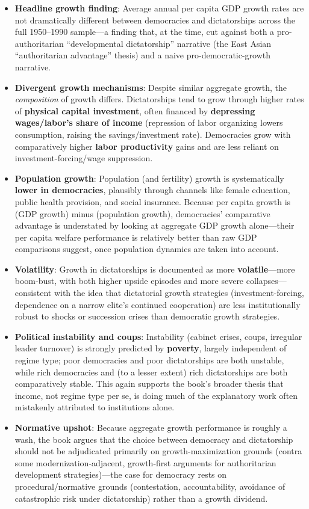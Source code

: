 \documentclass[12pt]{article}
\begin{document}
\begin{itemize}[leftmargin=*, itemsep=4pt]
    \item \textbf{Headline growth finding}: Average annual per capita GDP growth rates are not dramatically different between democracies and dictatorships across the full 1950--1990 sample---a finding that, at the time, cut against both a pro-authoritarian ``developmental dictatorship'' narrative (the East Asian ``authoritarian advantage'' thesis) and a naive pro-democratic-growth narrative.
    \item \textbf{Divergent growth mechanisms}: Despite similar aggregate growth, the \textit{composition} of growth differs. Dictatorships tend to grow through higher rates of \textbf{physical capital investment}, often financed by \textbf{depressing wages/labor's share of income} (repression of labor organizing lowers consumption, raising the savings/investment rate). Democracies grow with comparatively higher \textbf{labor productivity} gains and are less reliant on investment-forcing/wage suppression.
    \item \textbf{Population growth}: Population (and fertility) growth is systematically \textbf{lower in democracies}, plausibly through channels like female education, public health provision, and social insurance. Because per capita growth is (GDP growth) minus (population growth), democracies' comparative advantage is understated by looking at aggregate GDP growth alone---their per capita welfare performance is relatively better than raw GDP comparisons suggest, once population dynamics are taken into account.
    \item \textbf{Volatility}: Growth in dictatorships is documented as more \textbf{volatile}---more boom-bust, with both higher upside episodes and more severe collapses---consistent with the idea that dictatorial growth strategies (investment-forcing, dependence on a narrow elite's continued cooperation) are less institutionally robust to shocks or succession crises than democratic growth strategies.
    \item \textbf{Political instability and coups}: Instability (cabinet crises, coups, irregular leader turnover) is strongly predicted by \textbf{poverty}, largely independent of regime type; poor democracies and poor dictatorships are both unstable, while rich democracies and (to a lesser extent) rich dictatorships are both comparatively stable. This again supports the book's broader thesis that income, not regime type per se, is doing much of the explanatory work often mistakenly attributed to institutions alone.
    \item \textbf{Normative upshot}: Because aggregate growth performance is roughly a wash, the book argues that the choice between democracy and dictatorship should not be adjudicated primarily on growth-maximization grounds (contra some modernization-adjacent, growth-first arguments for authoritarian development strategies)---the case for democracy rests on procedural/normative grounds (contestation, accountability, avoidance of catastrophic risk under dictatorship) rather than a growth dividend.
\end{itemize}
\end{document}
